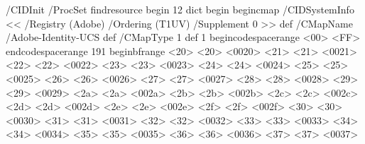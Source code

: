 

\startpdffontresource[il2]
/CIDInit /ProcSet findresource begin
12 dict begin
  begincmap
    /CIDSystemInfo
      << /Registry (Adobe)
         /Ordering (T1UV)
         /Supplement 0
      >> def
    /CMapName /Adobe-Identity-UCS def
    /CMapType 1 def
    1 begincodespacerange
      <00> <FF>
    endcodespacerange
    191 beginbfrange
      <20> <20> <0020> %
      <21> <21> <0021> %
      <22> <22> <0022> %
      <23> <23> <0023> %
      <24> <24> <0024> %
      <25> <25> <0025> %
      <26> <26> <0026> %
      <27> <27> <0027> %
      <28> <28> <0028> %
      <29> <29> <0029> %
      <2a> <2a> <002a> %
      <2b> <2b> <002b> %
      <2c> <2c> <002c> %
      <2d> <2d> <002d> %
      <2e> <2e> <002e> %
      <2f> <2f> <002f> %
      <30> <30> <0030> %
      <31> <31> <0031> %
      <32> <32> <0032> %
      <33> <33> <0033> %
      <34> <34> <0034> %
      <35> <35> <0035> %
      <36> <36> <0036> %
      <37> <37> <0037> %

